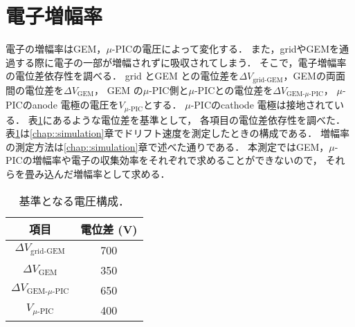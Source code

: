 \documentclass[../master]{subfiles}
\begin{document}
\section{電子増幅率}
電子の増幅率はGEM，$\mu$-PICの電圧によって変化する．
また，gridやGEMを通過する際に電子の一部が増幅されずに吸収されてしまう．
そこで，電子増幅率の電位差依存性を調べる．
grid とGEM との電位差を$\Delta V_{\text{grid-GEM}}$，GEMの両面間の電位差を$\Delta V_{\text{GEM}}$，
GEM の$\mu$-PIC側と$\mu$-PICとの電位差を$\Delta V_{\text{GEM-}\mu\text{-PIC}}$，
$\mu$-PICのanode 電極の電圧を$V_{\mu\text{-PIC}}$とする．
$\mu$-PICのcathode 電極は接地されている．
表\ref{tab::voltage_configuration}にあるような電位差を基準として，
各項目の電位差依存性を調べた．
表\ref{tab::voltage_configuration}は\ref{chap::simulation}章でドリフト速度を測定したときの構成である．
増幅率の測定方法は\ref{chap::simulation}章で述べた通りである．
本測定ではGEM，$\mu$-PICの増幅率や電子の収集効率をそれぞれで求めることができないので，
それらを畳み込んだ増幅率として求める．
\begin{table}
  \centering
  \caption{基準となる電圧構成．}
  \label{tab::voltage_configuration}
%  
  \begin{tabular}{cc}
    \toprule
    項目 & 電位差 (\si{\volt}) \\
    \midrule
    $\Delta V_{\text{grid-GEM}}$ & 700 \\
    $\Delta V_{\text{GEM}}$ & 350 \\
    $\Delta V_{\text{GEM-}\mu\text{-PIC}}$ & 650 \\
    $V_{\mu\text{-PIC}}$ & 400 \\
    \bottomrule
  \end{tabular}
\end{table}

\end{document}
